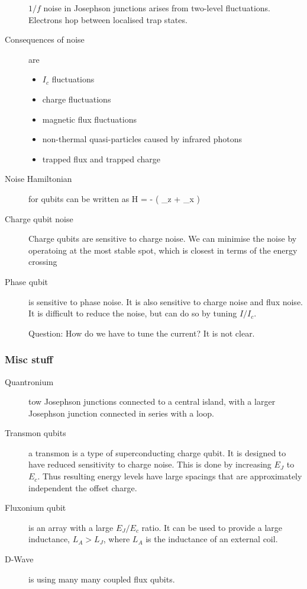 \begin{description}
$1/f$ noise in Josephson junctions arises from two-level fluctuations. Electrons hop between localised trap states. 

\item[Consequences of noise] are
\begin{itemize}
\item $I_c$ fluctuations
\item charge fluctuations
\item magnetic flux fluctuations
\item non-thermal quasi-particles caused by infrared photons
\item trapped flux and trapped charge
\end{itemize}

\item[Noise Hamiltonian ] for qubits can be written as
\beq
H = -  \left( \epsilon \sigma_z + \Delta \sigma_x \right)
\eeq

\item[Charge qubit noise] Charge qubits are sensitive to charge noise. We can minimise the noise by operatoing at the most stable spot, which is closest in terms of the energy crossing

\item[Phase qubit] is sensitive to phase noise. It is also sensitive to charge noise and flux noise. It is difficult to reduce the noise, but can do so by tuning $I/I_c$. 

Question: How do we have to tune the current? It is not clear. 

\end{description}
\subsubsection{Misc stuff}
\begin{description}
\item[Quantronium] tow Josephson junctions connected to a central island, with a larger Josephson junction connected in series with a loop. 

\item[Transmon qubits] a transmon is a type of superconducting charge qubit. It is designed to have reduced sensitivity to charge noise. This is done by increasing $E_J$ to $E_c$. Thus resulting energy levels have large spacings that are approximately independent the offset charge. 

\item[Fluxonium qubit] is an array with a large $E_J/E_c$ ratio. It can be used to provide a large inductance, $L_A>L_J$, where $L_A$ is the inductance of an external coil. 

\item[D-Wave] is using many many coupled flux qubits. 



\end{description}
